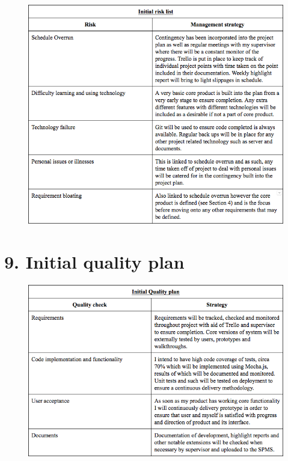 \documentclass[a4paper]{article}
\begin{document}
\begin{figure}

    \includegraphics[width=\linewidth]{img/initial-risk-table.png}

\end{figure}

\section{9. Initial quality plan}

\begin{figure}

    \includegraphics[width=\linewidth]{img/initial-quality-table.png}

\end{figure}
\end{document}
